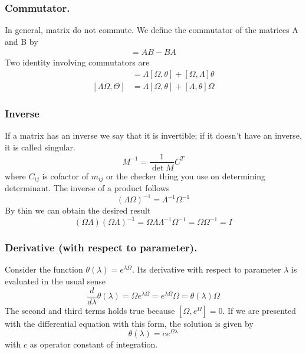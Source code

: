 \documentclass[../main.tex]{subfiles}
\begin{document}
\subsubsection*{Commutator.}
In general, matrix do not commute. We define the commutator of the matrices A and B by
\begin{align*}
	[A, B] = AB - BA
\end{align*}
Two identity involving commutators are
\begin{align*}
	[\Omega,\Lambda\theta] & =\Lambda[\Omega,\theta]+[\Omega,\Lambda]\theta \\
	[\Lambda\Omega,\Theta] & =\Lambda[\Omega,\theta]+[\Lambda,\theta]\Omega
\end{align*}

\subsubsection*{Inverse}
If a matrix has an inverse we say that it is invertible; if it doesn't have an inverse, it is called singular.
\begin{equation*}
	M^{-1}=\frac{1}{\det M}C^{T}
\end{equation*}
where $C_{ij}$ is cofactor of $m_{ij}$ or the checker thing you use on determining determinant.
The inverse of a product follows
\begin{equation*}
	(\Lambda\Omega)^{-1}=\Lambda^{-1}\Omega^{-1}
\end{equation*}
By thin we can obtain the desired result
\begin{equation*}
	(\Omega\Lambda)(\Omega\Lambda)^{-1}=\Omega\Lambda\Lambda^{-1}\Omega^{-1}=\Omega\Omega^{-1}=I
\end{equation*}

\subsubsection*{Derivative (with respect to parameter).}
Consider the function $\theta(\lambda)=e^{\lambda\Omega}$.
Its derivative with respect to parameter $\lambda$ is evaluated in the usual sense 
\begin{equation*}
	\frac{d}{d\lambda}\theta(\lambda)=\Omega e^{\lambda\Omega}=e^{\lambda\Omega}\Omega=\theta(\lambda)\Omega
\end{equation*}
The second and third terms holds true because $[\Omega,e^{\Omega}]=0$. 
If we are presented with the differential equation with this form, the solution is given by
\begin{equation*}
	\theta(\lambda)=ce^{\Omega \lambda}
\end{equation*}
with $c$ as operator constant of integration.
\end{document}
